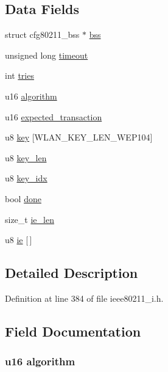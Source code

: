 \subsection*{Data Fields}
\begin{DoxyCompactItemize}
\item 
struct cfg80211\-\_\-bss $\ast$ \hyperlink{structieee80211__mgd__auth__data_aa8d95d64d2cb5a56a0fd985733e99b06}{bss}
\item 
unsigned long \hyperlink{structieee80211__mgd__auth__data_a639e65bbd749de17060d658eb233f72b}{timeout}
\item 
int \hyperlink{structieee80211__mgd__auth__data_a04cecf6708b77deed43900afdf14e8d9}{tries}
\item 
u16 \hyperlink{structieee80211__mgd__auth__data_a06e10b0ef0f5383fa500ca8e41e202fd}{algorithm}
\item 
u16 \hyperlink{structieee80211__mgd__auth__data_aee8d23c4383cb7075b11300a3b995a0c}{expected\-\_\-transaction}
\item 
u8 \hyperlink{structieee80211__mgd__auth__data_a54c7b6b270bee3f1d18fad51c228779c}{key} \mbox{[}W\-L\-A\-N\-\_\-\-K\-E\-Y\-\_\-\-L\-E\-N\-\_\-\-W\-E\-P104\mbox{]}
\item 
u8 \hyperlink{structieee80211__mgd__auth__data_aec6022b50f2f89ff144d7b68d09b7ffe}{key\-\_\-len}
\item 
u8 \hyperlink{structieee80211__mgd__auth__data_aa2edccbb034732153bf9cbf5412660f9}{key\-\_\-idx}
\item 
bool \hyperlink{structieee80211__mgd__auth__data_a1d39aac66e12dae50a24cd7a9100ef33}{done}
\item 
size\-\_\-t \hyperlink{structieee80211__mgd__auth__data_a0b939c31983d2de4c3429bb789779638}{ie\-\_\-len}
\item 
u8 \hyperlink{structieee80211__mgd__auth__data_a541e8335bc4529e686c2b6699284de24}{ie} \mbox{[}$\,$\mbox{]}
\end{DoxyCompactItemize}


\subsection{Detailed Description}


Definition at line 384 of file ieee80211\-\_\-i.\-h.



\subsection{Field Documentation}
\hypertarget{structieee80211__mgd__auth__data_a06e10b0ef0f5383fa500ca8e41e202fd}{
\subsubsection[{algorithm}]{\setlength{\rightskip}{0pt plus 5cm}u16 algorithm}}\label{structieee80211__mgd__auth__data_a06e10b0ef0f5383fa500ca8e41e202fd}


